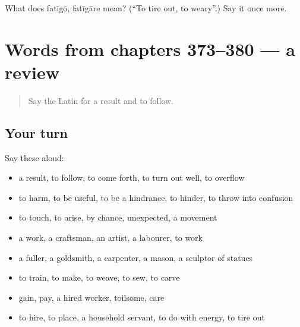 \begin{tcolorbox}[breakable,colback=teal!4,colframe=teal!35!black,title={Before you move on}]
What does fatīgō, fatīgāre mean? (\textquotedblleft{}To tire out, to weary\textquotedblright{}.) Say it once more.
\end{tcolorbox}
\section[(dialogue)]{Words from chapters 373–380 — a review}

\label{lesson:LA-R380-review-373-380}



\begin{quote}
Say the Latin for a result and to follow.
\end{quote}

\subsection*{Your turn}
Say these aloud:

\begin{itemize}
\raggedright
  \item a result, to follow, to come forth, to turn out well, to overflow
  \item to harm, to be useful, to be a hindrance, to hinder, to throw into confusion
  \item to touch, to arise, by chance, unexpected, a movement
  \item a work, a craftsman, an artist, a labourer, to work
  \item a fuller, a goldsmith, a carpenter, a mason, a sculptor of statues
  \item to train, to make, to weave, to sew, to carve
  \item gain, pay, a hired worker, toilsome, care
  \item to hire, to place, a household servant, to do with energy, to tire out
\end{itemize}

